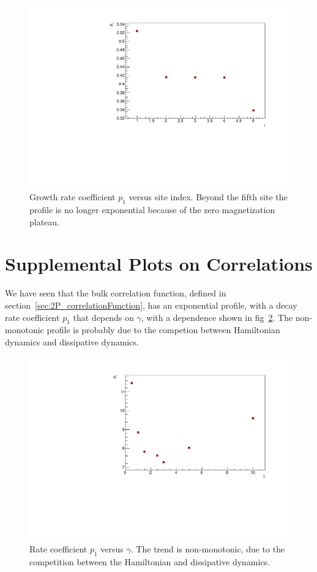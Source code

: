 \begin{figure}[H]
    \centering
    \captionsetup{width=1.\linewidth}
    \includegraphics[scale=0.6]{Figures/16sites_p1VSsiteIndex.pdf}
    \caption{Growth rate coefficient $p_1$ versus site index. Beyond the fifth site the profile is no longer exponential because of the zero magnetization plateau.}
    \label{fig:16sites_p1VSsiteIndex}
\end{figure}

\section{Supplemental Plots on Correlations}
We have seen that the bulk correlation function, defined in section~\ref{sec:2P_correlationFunction}, has an exponential profile, with a decay rate coefficient $p_1$ that depends on $\gamma$, with a dependence shown in fig~\ref{fig:CFBulkCONN_p1vsGamma}. The non-monotonic profile is probably due to the competion between Hamiltonian dynamics and dissipative dynamics.

\begin{figure}[H]
    \centering
    \captionsetup{width=1.\linewidth}
    \includegraphics[scale=0.6]{Figures/CFBulkCONN_p1vsGamma.pdf}
    \caption{Rate coefficient $p_1$ versus $\gamma$. The trend is non-monotonic, due to the competition between the Hamiltonian and dissipative dynamics.}
    \label{fig:CFBulkCONN_p1vsGamma}
\end{figure}

